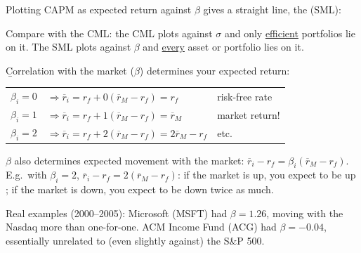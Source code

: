 Plotting CAPM as expected return against $\beta$ gives a straight line, the  (SML):
\begin{center}
\end{center}
Compare with the CML: the CML plots against $\sigma$ and only \ul{efficient} portfolios lie on it. The SML plots against $\beta$ and \ul{every} asset or portfolio lies on it.

\b{Correlation with the market ($\beta$) determines your expected return}:
\begin{center}
\begin{tabular}{lll}
    $\beta_i = 0$ & $\Rightarrow \overline{r}_i = r_f + 0(\overline{r}_M - r_f) = r_f$ & risk-free rate\\
    $\beta_i = 1$ & $\Rightarrow \overline{r}_i = r_f + 1(\overline{r}_M - r_f) = \overline{r}_M$ & market return!\\
    $\beta_i = 2$ & $\Rightarrow \overline{r}_i = r_f + 2(\overline{r}_M - r_f) = 2\overline{r}_M - r_f$ & etc.
\end{tabular}
\end{center}

\b{$\beta$ also determines expected movement with the market}: $\overline{r}_i - r_f = \beta_i(\overline{r}_M - r_f)$. E.g.\ with $\beta_i = 2$, $\overline{r}_i - r_f = 2(\overline{r}_M - r_f)$: if the market is up, you expect to be up ; if the market is down, you expect to be down twice as much.

Real examples (2000--2005): Microsoft (MSFT) had $\beta = 1.26$, moving with the Nasdaq more than one-for-one. ACM Income Fund (ACG) had $\beta = -0.04$, essentially unrelated to (even slightly against) the S\&P 500.

